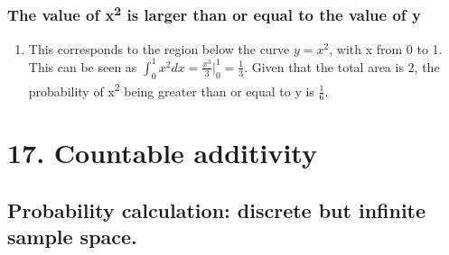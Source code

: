 \documentclass[11pt]{article}
\begin{document}
\subsubsection{The value of x\textsuperscript{2} is larger than or equal to the value of y}
\label{sec:org562f238}
\begin{enumerate}
\item This corresponds to the region below the curve \(y=x^2\), with x from 0 to 1. This can be seen as \(\int_0^1 x^2 dx = \frac{x^3}{3} |_0^1 = \frac{1}{3}\). Given that the total area is 2, the probability of x\textsuperscript{2} being greater than or equal to y is \(\frac{1}{6}\).
\label{sec:org0a69f1d}
\end{enumerate}
\section{17. Countable additivity}
\label{sec:org2e44841}
\subsection{Probability calculation: discrete but infinite sample space.}
\label{sec:org6fc3cb2}
\end{document}
